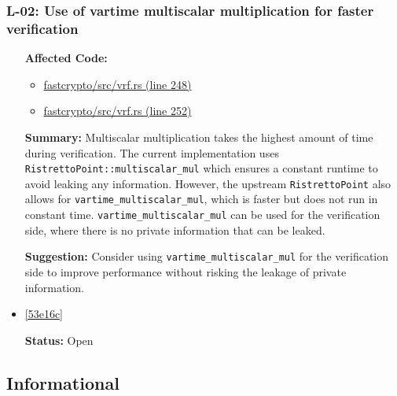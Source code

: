 \subsubsection*{L-02: Use of vartime multiscalar multiplication for faster verification}
\begin{itemize}[align=left]
\item[\textbf{Affected Code:}] \
\begin{itemize}
\item \href{https://github.com/MystenLabs/fastcrypto/blob/963205c6d0538fe548b8b10037cf87a53af6f424/fastcrypto/src/vrf.rs#L248}{fastcrypto/src/vrf.rs (line 248)}
\item \href{https://github.com/MystenLabs/fastcrypto/blob/963205c6d0538fe548b8b10037cf87a53af6f424/fastcrypto/src/vrf.rs#L252}{fastcrypto/src/vrf.rs (line 252)}
\end{itemize}
\item[\textbf{Summary:}] Multiscalar multiplication takes the highest amount of time during verification. The current implementation uses \lstinline{RistrettoPoint::multiscalar_mul} which ensures a constant runtime to avoid leaking any information. However, the upstream \lstinline{RistrettoPoint} also allows for \lstinline{vartime_multiscalar_mul}, which is faster but does not run in constant time. \lstinline{vartime_multiscalar_mul} can be used for the verification side, where there is no private information that can be leaked.
\item[\textbf{Suggestion:}] Consider using \lstinline{vartime_multiscalar_mul} for the verification side to improve performance without risking the leakage of private information.
\item[\textbf{Suggested Fix:}] \href{https://github.com/MystenLabs/fastcrypto/pull/543/commits/53e16c8f82d63a84cdc842d93fc5c26cebbe109b}{[53e16c]}
\item[\textbf{Status:}] Open
\end{itemize}

\subsection{Informational}
